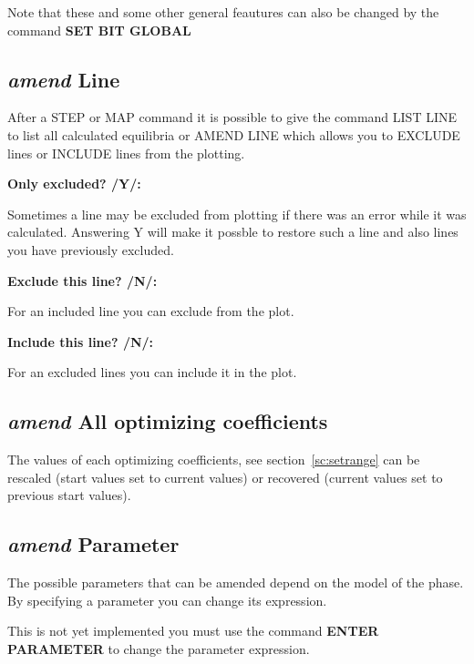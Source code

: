 \documentclass[11pt]{article}
\begin{document}
Note that these and some other general feautures can also be changed
by the command {\bf SET BIT GLOBAL}

\hypertarget{Amend line}{}
\subsection{{\em amend} Line}

After a STEP or MAP command it is possible to give the command LIST
LINE to list all calculated equilibria or AMEND LINE which allows you
to EXCLUDE lines or INCLUDE lines from the plotting.

{\bf Only excluded? /Y/:}

Sometimes a line may be excluded from plotting if there was an error
while it was calculated.  Answering Y will make it possble to restore
such a line and also lines you have previously excluded.

{\bf Exclude this line? /N/:}

For an included line you can exclude from the plot.

{\bf Include this line? /N/:}

For an excluded lines you can include it in the plot.

\hypertarget{Amend optim coeffs}{}
\subsection{{\em amend} All optimizing coefficients}

The values of each optimizing coefficients, see
section~\ref{sc:setrange} can be rescaled (start values set to current
values) or recovered (current values set to previous start values).

\hypertarget{Amend parameter}{}  
\subsection{{\em amend} Parameter}

The possible parameters that can be amended depend on the model of the
phase.  By specifying a parameter you can change its expression.

This is not yet implemented you must use the command {\bf ENTER
  PARAMETER} to change the parameter expression.

\hypertarget{Amend for phase}{}
\hypertarget{Amend phase}{}
\end{document}
